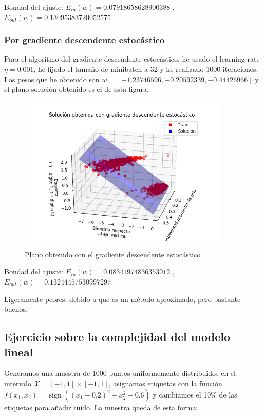 \documentclass[a4]{article}
\begin{document}
\vspace{-5mm}

Bondad del ajuste: \quad
$E_{in}(w)=0.07918658628900388$ ,\qquad
$E_{out}(w)=0.13095383720052575$

\subsubsection{Por gradiente descendente estocástico}
Para el algoritmo del gradiente descendente estocástico, he usado el learning rate $\eta=0.001$, he fijado el tamaño de minibatch a 32 y he realizado 1000 iteraciones. Los pesos que he obtenido son
$w=[-1.23746596,-0.20592339, -0.44426966]$ y el plano
solución obtenido es el de esta figura. \vspace{-4mm}

\begin{figure}[H]
    \centering    
    \includegraphics[width=100mm]{imgs/digitos-sgd.png}
    \caption{Plano obtenido con el gradiente descendente estocástico}
    \label{fig:digitos-sgd}
\end{figure}

\vspace{-5mm}

Bondad del ajuste: \quad
$E_{in}(w)=0.08341974836353012$ ,\qquad
$E_{out}(w)=0.13244457530997297$

Ligeramente peores, debido a que es un método aproximado, pero bastante buenos.

\subsection{Ejercicio sobre la complejidad del modelo lineal}

Generamos una muestra de 1000 puntos uniformemente distribuidos en el intervalo
$\mathcal{X}=[-1,1]\times[-1,1]$, asignamos etiquetas
con la función $f(x_1,x_2)=\operatorname{sign}((x_1-0.2)^2+x_2^2-0.6)$ y
cambiamos el 10\% de las etiquetas para añadir ruido. La muestra queda de esta forma: \vspace{-4mm}
\end{document}
